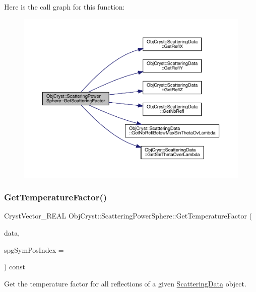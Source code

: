 Here is the call graph for this function\+:
\nopagebreak
\begin{figure}[H]
\begin{center}
\leavevmode
\includegraphics[width=350pt]{class_obj_cryst_1_1_scattering_power_sphere_aad2a92da56fe7e50e585a0ad24da5c83_cgraph}
\end{center}
\end{figure}
\mbox{\label{class_obj_cryst_1_1_scattering_power_sphere_a279d60a417e6378ad001be222385cced}} 
\subsubsection{\texorpdfstring{GetTemperatureFactor()}{GetTemperatureFactor()}}
{\footnotesize\ttfamily Cryst\+Vector\+\_\+\+R\+E\+AL Obj\+Cryst\+::\+Scattering\+Power\+Sphere\+::\+Get\+Temperature\+Factor (\begin{DoxyParamCaption}\item[{const \mbox{\hyperlink{class_obj_cryst_1_1_scattering_data}{Scattering\+Data}} \&}]{data,  }\item[{const int}]{spg\+Sym\+Pos\+Index = {} }\end{DoxyParamCaption}) const\hspace{0.3cm}{\ttfamily [virtual]}}



Get the temperature factor for all reflections of a given \mbox{\hyperlink{class_obj_cryst_1_1_scattering_data}{Scattering\+Data}} object. 

